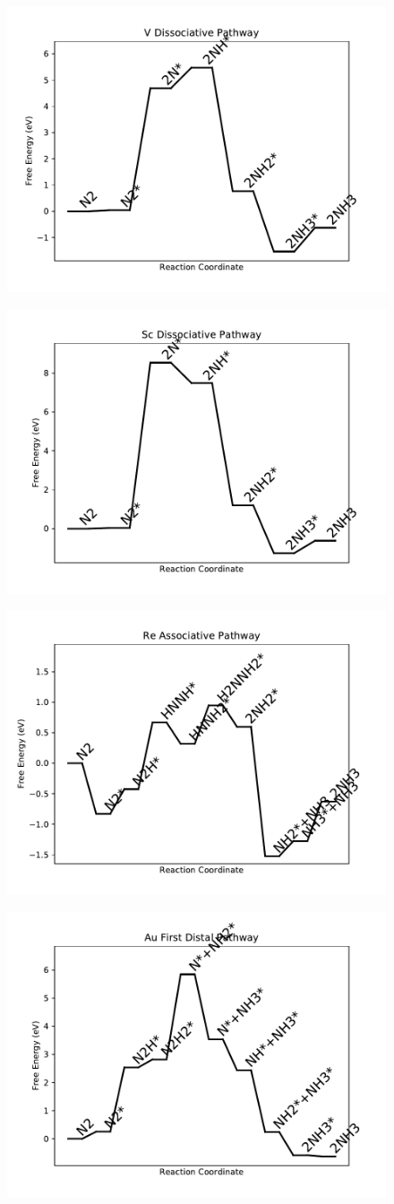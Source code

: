 \documentclass[journal=jacsat,manuscript=article]{achemso}
\begin{document}
\newpage
\begin{figure}
\includegraphics[width=0.5\linewidth]{data/plots/V_dissociative.pdf}
\label{fig:V_dissociative}
\end{figure}

\begin{figure}
\includegraphics[width=0.5\linewidth]{data/plots/Sc_dissociative.pdf}
\label{fig:Sc_dissociative}
\end{figure}

\newpage
\begin{figure}
\includegraphics[width=0.5\linewidth]{data/plots/Re_associative.pdf}
\label{fig:Re_associative}
\end{figure}

\begin{figure}
\includegraphics[width=0.5\linewidth]{data/plots/Au_distal_1.pdf}
\label{fig:Au_distal_1}
\end{figure}
\end{document}
